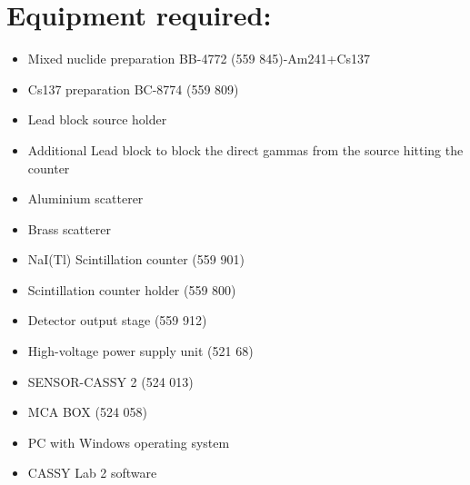 \section{Equipment required:}
	\begin{itemize}
		\item Mixed nuclide preparation BB-4772 (559 845)-Am241+Cs137
		\item Cs137 preparation BC-8774 (559 809)
		\item Lead block source holder
		\item Additional Lead block to block the direct gammas from the source hitting the
		counter
		\item Aluminium scatterer
		\item Brass scatterer
		\item NaI(Tl) Scintillation counter (559 901)
		\item Scintillation counter holder (559 800)
		\item Detector output stage (559 912)
		\item High-voltage power supply unit (521 68)
		\item SENSOR-CASSY 2 (524 013)
		\item MCA BOX (524 058)
		\item PC with Windows operating system
		\item CASSY Lab 2 software

	\end{itemize}